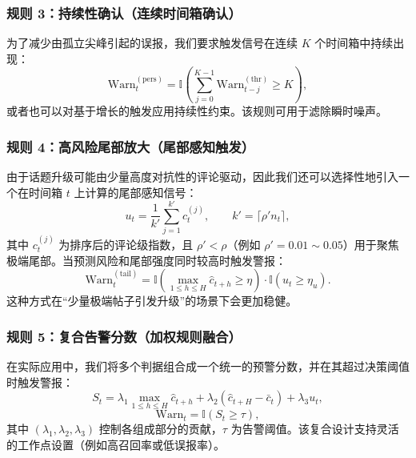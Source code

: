 \documentclass[conference]{IEEEtran}
\begin{document}
\subsubsection{规则 3：持续性确认（连续时间箱确认）}

为了减少由孤立尖峰引起的误报，我们要求触发信号在连续 $K$ 个时间箱中持续出现：
\begin{equation}
\mathrm{Warn}_t^{(\mathrm{pers})}=
\mathbb{I}\left(\sum_{j=0}^{K-1}\mathrm{Warn}_{t-j}^{(\mathrm{thr})}\ge K\right),
\label{eq:warn_persist}
\end{equation}
或者也可以对基于增长的触发应用持续性约束。该规则可用于滤除瞬时噪声。

\subsubsection{规则 4：高风险尾部放大（尾部感知触发）}

由于话题升级可能由少量高度对抗性的评论驱动，因此我们还可以选择性地引入一个在时间箱 $t$ 上计算的尾部感知信号：
\begin{equation}
u_t = \frac{1}{k'}\sum_{j=1}^{k'} c_t^{(j)},\qquad k'=\lceil \rho' n_t\rceil,
\label{eq:tail_signal}
\end{equation}
其中 $c_t^{(j)}$ 为排序后的评论级指数，且 $\rho' < \rho$（例如 $\rho'=0.01\sim0.05$）用于聚焦极端尾部。当预测风险和尾部强度同时较高时触发警报：
\begin{equation}
\mathrm{Warn}_t^{(\mathrm{tail})}=
\mathbb{I}\left(\max_{1\le h\le H}\hat c_{t+h}\ge \eta\right)\cdot
\mathbb{I}(u_t\ge \eta_u).
\label{eq:warn_tail}
\end{equation}
这种方式在“少量极端帖子引发升级”的场景下会更加稳健。

\subsubsection{规则 5：复合告警分数（加权规则融合）}

在实际应用中，我们将多个判据组合成一个统一的预警分数，并在其超过决策阈值时触发警报：
\begin{equation}
S_t = \lambda_1 \max_{1\le h\le H}\hat c_{t+h}
      + \lambda_2 (\hat c_{t+H}-\bar c_t)
      + \lambda_3 u_t,
\label{eq:warn_score}
\end{equation}
\begin{equation}
\mathrm{Warn}_t=\mathbb{I}(S_t\ge \tau),
\label{eq:warn_final}
\end{equation}
其中 $(\lambda_1,\lambda_2,\lambda_3)$ 控制各组成部分的贡献，$\tau$ 为告警阈值。该复合设计支持灵活的工作点设置（例如高召回率或低误报率）。
\end{document}
